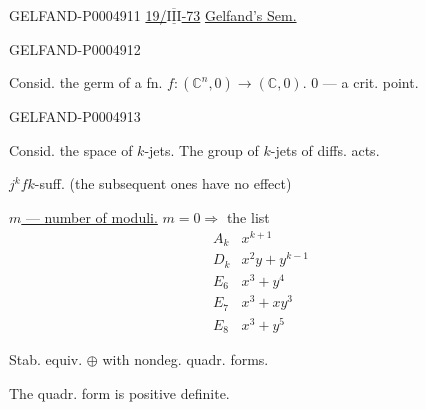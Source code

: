 \begin{GelfandAdjacentEvidence}{GELFAND-P000491}{1}
\uline{19/\mbox{$\overline{\underline{\mathrm{III}}}$}-73}
\qquad\uline{Gelfand’s Sem.}
\end{GelfandAdjacentEvidence}
\begin{GelfandAdjacentEvidence}{GELFAND-P000491}{2}


\quad Consid. the germ of a fn. $f:(\mathbb C^n,0)\longrightarrow(\mathbb C,0)$.
$0$ — a crit. point.
\end{GelfandAdjacentEvidence}
\begin{GelfandAdjacentEvidence}{GELFAND-P000491}{3}


Consid. the space of $k$-jets. The group of $k$-jets of diffs. acts.

$j^k f$\qquad $k$-suff. (the subsequent ones have no effect)

\uline{\mbox{$m$} — number of moduli.}
\quad $m=0\Longrightarrow$ the list
\[
\begin{array}{ll}
A_k & x^{k+1}\\
D_k & x^2y+y^{k-1}\\
E_6 & x^3+y^4\\
E_7 & x^3+xy^3\\
E_8 & x^3+y^5
\end{array}
\]
\end{GelfandAdjacentEvidence}


Stab. equiv. \quad $\oplus$ with nondeg. quadr. forms.

The quadr. form is positive definite.



